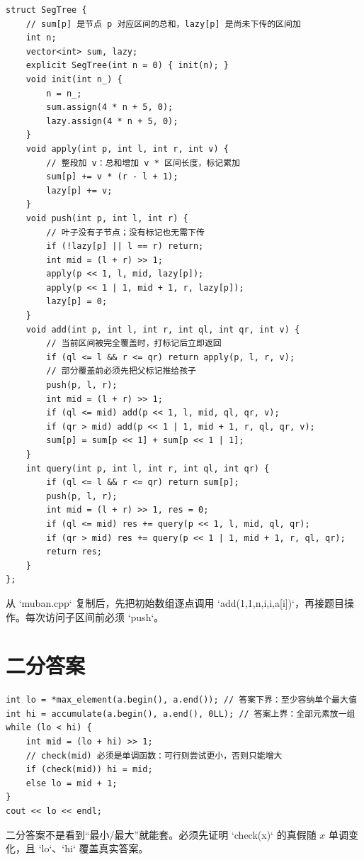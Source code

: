 \begin{lstlisting}[style=cpp]
struct SegTree {
    // sum[p] 是节点 p 对应区间的总和，lazy[p] 是尚未下传的区间加
    int n;
    vector<int> sum, lazy;
    explicit SegTree(int n = 0) { init(n); }
    void init(int n_) {
        n = n_;
        sum.assign(4 * n + 5, 0);
        lazy.assign(4 * n + 5, 0);
    }
    void apply(int p, int l, int r, int v) {
        // 整段加 v：总和增加 v * 区间长度，标记累加
        sum[p] += v * (r - l + 1);
        lazy[p] += v;
    }
    void push(int p, int l, int r) {
        // 叶子没有子节点；没有标记也无需下传
        if (!lazy[p] || l == r) return;
        int mid = (l + r) >> 1;
        apply(p << 1, l, mid, lazy[p]);
        apply(p << 1 | 1, mid + 1, r, lazy[p]);
        lazy[p] = 0;
    }
    void add(int p, int l, int r, int ql, int qr, int v) {
        // 当前区间被完全覆盖时，打标记后立即返回
        if (ql <= l && r <= qr) return apply(p, l, r, v);
        // 部分覆盖前必须先把父标记推给孩子
        push(p, l, r);
        int mid = (l + r) >> 1;
        if (ql <= mid) add(p << 1, l, mid, ql, qr, v);
        if (qr > mid) add(p << 1 | 1, mid + 1, r, ql, qr, v);
        sum[p] = sum[p << 1] + sum[p << 1 | 1];
    }
    int query(int p, int l, int r, int ql, int qr) {
        if (ql <= l && r <= qr) return sum[p];
        push(p, l, r);
        int mid = (l + r) >> 1, res = 0;
        if (ql <= mid) res += query(p << 1, l, mid, ql, qr);
        if (qr > mid) res += query(p << 1 | 1, mid + 1, r, ql, qr);
        return res;
    }
};
\end{lstlisting}

\begin{tipbox}
从 `muban.cpp` 复制后，先把初始数组逐点调用 `add(1,1,n,i,i,a[i])`，再接题目操作。每次访问子区间前必须 `push`。
\end{tipbox}

\section{二分答案}


\begin{lstlisting}[style=cpp]
int lo = *max_element(a.begin(), a.end()); // 答案下界：至少容纳单个最大值
int hi = accumulate(a.begin(), a.end(), 0LL); // 答案上界：全部元素放一组
while (lo < hi) {
    int mid = (lo + hi) >> 1;
    // check(mid) 必须是单调函数：可行则尝试更小，否则只能增大
    if (check(mid)) hi = mid;
    else lo = mid + 1;
}
cout << lo << endl;
\end{lstlisting}

\begin{warnbox}
二分答案不是看到“最小/最大”就能套。必须先证明 `check(x)` 的真假随 \(x\) 单调变化，且 `lo`、`hi` 覆盖真实答案。
\end{warnbox}
